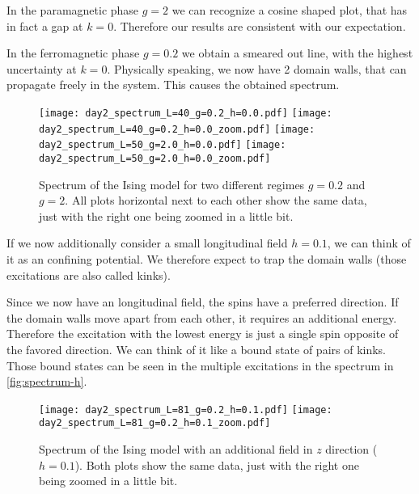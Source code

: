 In the paramagnetic phase $g=\num{2}$ we can recognize a cosine shaped plot, that has in fact a gap at $k=0$.
Therefore our results are consistent with our expectation.

In the ferromagnetic phase $g=\num{0.2}$ we obtain a smeared out line, with the highest uncertainty at $k=0$.
Physically speaking, we now have 2 domain walls, that can propagate freely in the system.
This causes the obtained spectrum.

\begin{figure}[htbp]
    \centering
    \texttt{[image: day2\_spectrum\_L=40\_g=0.2\_h=0.0.pdf]}
    \texttt{[image: day2\_spectrum\_L=40\_g=0.2\_h=0.0\_zoom.pdf]}
    \texttt{[image: day2\_spectrum\_L=50\_g=2.0\_h=0.0.pdf]}
    \texttt{[image: day2\_spectrum\_L=50\_g=2.0\_h=0.0\_zoom.pdf]}
    \caption{Spectrum of the Ising model for two different regimes $g=\num{0.2}$ and $g=\num{2}$. All plots horizontal next to each other show the same data, just with the right one being zoomed in a little bit.}
\end{figure}




\newpage
If we now additionally consider a small longitudinal field $h=\num{0.1}$, we can think of it as an confining potential.
We therefore expect to trap the domain walls (those excitations are also called kinks).

Since we now have an longitudinal field, the spins have a preferred direction.
If the domain walls move apart from each other, it requires an additional energy.
Therefore the excitation with the lowest energy is just a single spin opposite of the favored direction.
We can think of it like a bound state of pairs of kinks.
Those bound states can be seen in the multiple excitations in the spectrum in \autoref{fig:spectrum-h}.

\begin{figure}[htbp]
    \centering
    \texttt{[image: day2\_spectrum\_L=81\_g=0.2\_h=0.1.pdf]}
    \texttt{[image: day2\_spectrum\_L=81\_g=0.2\_h=0.1\_zoom.pdf]}
    \label{fig:spectrum-h}
    \caption{Spectrum of the Ising model with an additional field in $z$ direction ($h=\num{0.1}$). Both plots show the same data, just with the right one being zoomed in a little bit.}
\end{figure}

